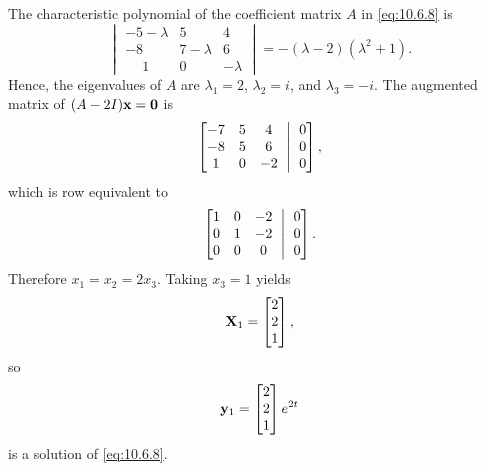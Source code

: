 \begin{solution}
The characteristic
polynomial of the  coefficient matrix $A$ in  \eqref{eq:10.6.8} is
\[
\begin{vmatrix}
-5-\lambda&5&4\\-8&7-\lambda&6\\ \phantom{-}1&0&-\lambda
\end{vmatrix}=-(\lambda-2)(\lambda^2+1).
\]
Hence, the eigenvalues of $A$ are $\lambda_1=2$, $\lambda_2=i$, and
$\lambda_3=-i$.
The augmented matrix of $(A-2I)\mathbf{x}=\mathbf{0}$ is
\[
\amatrix{-7&5&4\\-8&5&6\\1&0&-2}{0\\0\\0},
\]
which is row equivalent to
\[
\amatrix{1&0&-2\\0&1&-2\\0&0&0}{0\\0\\0}.
\]
Therefore $x_1=x_2=2x_3$.  Taking $x_3=1$ yields
\[
\mathbf{X}_1=\begin{bmatrix}2\\2\\1\end{bmatrix},
\]
so
\[
\mathbf{y}_1=\begin{bmatrix}2\\2\\1\end{bmatrix}e^{2t}
\]
is a solution of  \eqref{eq:10.6.8}.


\end{solution}
